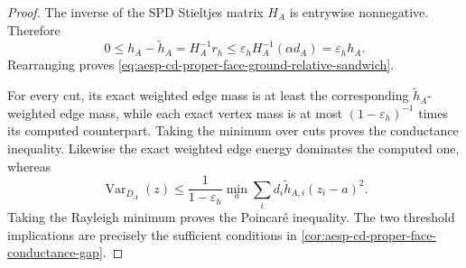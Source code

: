 \begin{proof}
The inverse of the SPD Stieltjes matrix \(H_A\) is entrywise nonnegative.
Therefore
\begin{equation*}
 0\leq h_A-\widetilde h_A=H_A^{-1}r_h
 \leq\varepsilon_h H_A^{-1}(\alpha d_A)
 =\varepsilon_h h_A.
\end{equation*}
Rearranging proves
\cref{eq:aesp-cd-proper-face-ground-relative-sandwich}.

For every cut, its exact weighted edge mass is at least the corresponding
\(\widetilde h_A\)-weighted edge mass, while each exact vertex mass is at
most \((1-\varepsilon_h)^{-1}\) times its computed counterpart.  Taking
the minimum over cuts proves the conductance inequality.  Likewise the
exact weighted edge energy dominates the computed one, whereas
\begin{equation*}
 \operatorname{Var}_{\bar D_A}(z)
 \leq\frac{1}{1-\varepsilon_h}
       \min_a\sum_i d_i\widetilde h_{A,i}(z_i-a)^2.
\end{equation*}
Taking the Rayleigh minimum proves the Poincar\'e inequality.  The two
threshold implications are precisely the sufficient conditions in
\cref{cor:aesp-cd-proper-face-conductance-gap}.
\end{proof}

